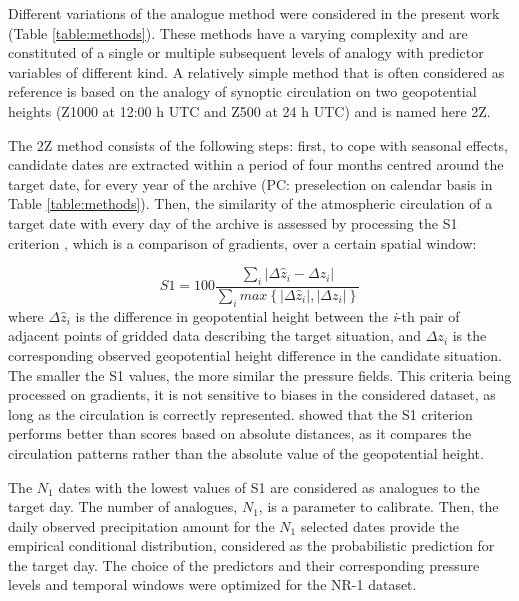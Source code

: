 \documentclass{ametsoc}
\begin{document}
Different variations of the analogue method were considered in the present work (Table \ref{table:methods}). These methods have a varying complexity and are constituted of a single or multiple subsequent levels of analogy with predictor variables of different kind. A relatively simple method that is often considered as reference is based on the analogy of synoptic circulation on two geopotential heights (Z1000 at 12:00 h UTC and Z500 at 24 h UTC) and is named here 2Z.

The 2Z method consists of the following steps: first, to cope with seasonal effects, candidate dates are extracted within a period of four months centred around the target date, for every year of the archive (PC: preselection on calendar basis in Table \ref{table:methods}). Then, the similarity of the atmospheric circulation of a target date with every day of the archive is assessed by processing the S1 criterion \citep[Eq.\ \ref{eq:S1}, ][]{Teweles1954, Drosdowsky2003}, which is a comparison of gradients, over a certain spatial window:

\begin{equation}
\label{eq:S1}
S1=100 \frac {\displaystyle \sum_{i} \vert \Delta\hat{z}_{i} - \Delta z_{i} \vert}
{\displaystyle \sum_{i} max\left\lbrace \vert \Delta\hat{z}_{i} \vert , \vert \Delta z_{i} \vert \right\rbrace }
\end{equation}
where $\Delta \hat{z}_{i}$ is the difference in geopotential height between the \textit{i}-th pair of adjacent points of gridded data describing the target situation, and $\Delta z_{i}$ is the corresponding observed geopotential height difference in the candidate situation. The smaller the S1 values, the more similar the pressure fields. This criteria being processed on gradients, it is not sensitive to biases in the considered dataset, as long as the circulation is correctly represented. \citet{Bontron2004} showed that the S1 criterion performs better than scores based on absolute distances, as it compares the circulation patterns rather than the absolute value of the geopotential height. 

The $N_{1}$ dates with the lowest values of S1 are considered as analogues to the target day. The number of analogues, $N_{1}$, is a parameter to calibrate. Then, the daily observed precipitation amount for the $N_{1}$ selected dates provide the empirical conditional distribution, considered as the probabilistic prediction for the target day. The choice of the predictors and their corresponding pressure levels and temporal windows were optimized for the NR-1 dataset.
\end{document}
